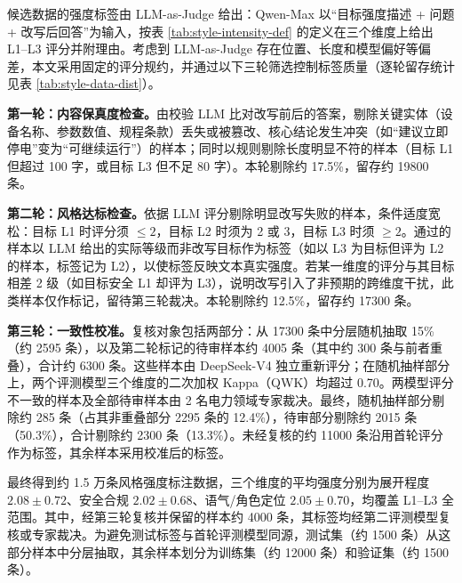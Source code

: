 \documentclass[fontset=fandol,type=master,campus=shenzhen,etitleauto=true]{hithesisbook}
\begin{document}
候选数据的强度标签由 LLM-as-Judge 给出：Qwen-Max 以“目标强度描述 + 问题 + 改写后回答”为输入，按表 \ref{tab:style-intensity-def} 的定义在三个维度上给出 L1--L3 评分并附理由。考虑到 LLM-as-Judge 存在位置、长度和模型偏好等偏差\cite{ref65}，本文采用固定的评分规约，并通过以下三轮筛选控制标签质量（逐轮留存统计见表 \ref{tab:style-data-dist}）。

\textbf{第一轮：内容保真度检查。}由校验 LLM 比对改写前后的答案，剔除关键实体（设备名称、参数数值、规程条款）丢失或被篡改、核心结论发生冲突（如“建议立即停电”变为“可继续运行”）的样本；同时以规则剔除长度明显不符的样本（目标 L1 但超过 100 字，或目标 L3 但不足 80 字）。本轮剔除约 17.5\%，留存约 19800 条。

\textbf{第二轮：风格达标检查。}依据 LLM 评分剔除明显改写失败的样本，条件适度宽松：目标 L1 时评分须 $\le 2$，目标 L2 时须为 2 或 3，目标 L3 时须 $\ge 2$。通过的样本以 LLM 给出的实际等级而非改写目标作为标签（如以 L3 为目标但评为 L2 的样本，标签记为 L2），以使标签反映文本真实强度。若某一维度的评分与其目标相差 2 级（如目标安全 L1 却评为 L3），说明改写引入了非预期的跨维度干扰，此类样本仅作标记，留待第三轮裁决。本轮剔除约 12.5\%，留存约 17300 条。

\textbf{第三轮：一致性校准。}复核对象包括两部分：从 17300 条中分层随机抽取 15\%（约 2595 条），以及第二轮标记的待审样本约 4005 条（其中约 300 条与前者重叠），合计约 6300 条。这些样本由 DeepSeek-V4 独立重新评分；在随机抽样部分上，两个评测模型三个维度的二次加权 Kappa（QWK）均超过 0.70。两模型评分不一致的样本及全部待审样本由 2 名电力领域专家裁决。最终，随机抽样部分剔除约 285 条（占其非重叠部分 2295 条的 12.4\%），待审部分剔除约 2015 条（50.3\%），合计剔除约 2300 条（13.3\%）。未经复核的约 11000 条沿用首轮评分作为标签，其余样本采用校准后的标签。

最终得到约 1.5 万条风格强度标注数据，三个维度的平均强度分别为展开程度 $2.08 \pm 0.72$、安全合规 $2.02 \pm 0.68$、语气/角色定位 $2.05 \pm 0.70$，均覆盖 L1--L3 全范围。其中，经第三轮复核并保留的样本约 4000 条，其标签均经第二评测模型复核或专家裁决。为避免测试标签与首轮评测模型同源，测试集（约 1500 条）从这部分样本中分层抽取，其余样本划分为训练集（约 12000 条）和验证集（约 1500 条）。
\end{document}
